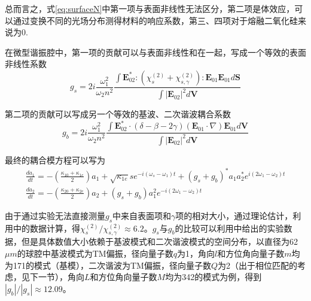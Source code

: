 \documentclass[UTF8,a4paper,cs4size,hyperref]{ctexart}
\begin{document}
总而言之，式\ref{eq:surfaceN}中第一项与表面非线性无法区分，第二项是体效应，可以通过变换不同的光场分布测得材料的响应系数，第三、四项对于熔融二氧化硅来说为0.

在微型谐振腔中，第一项的贡献可以与表面非线性和在一起，写成一个等效的表面非线性系数
\begin{equation}
g_s = 2i\frac{\omega_1^2}{\omega_2n^2}\frac{\int \mathbf{E}_{02}^*:(\chi^{(2)}_s+\chi^{(2)}_{s,\gamma}):\mathbf{E}_{01}\mathbf{E}_{01} d\mathbf{S}}{\int |\mathbf{E}_{02}|^2 d\mathbf{V}}
\label{eq:gs}
\end{equation}


第二项的贡献可以写成另一个等效的基波、二次谐波耦合系数
\begin{equation}
g_b =  2i\frac{\omega_1^2}{\omega_2n^2}\frac{\int \mathbf{E}_{02}^* \cdot (\delta-\beta-2\gamma)(\mathbf{E}_{01}\cdot\nabla)\mathbf{E}_{01} d\mathbf{V}}{\int |\mathbf{E}_{02}|^2 d\mathbf{V}}
\label{eq:gb}
\end{equation}

最终的耦合模方程可以写为
\begin{gather}
\label{eq:cpmode}
\frac{da_1}{dt} = -(\frac{\kappa_{10}+\kappa_{1e}}{2})a_1+\sqrt{\kappa_{1e}}se^{-i(\omega_s-\omega_1)t}+(g_s+g_b)^*a_1a_2^*e^{i(2\omega_1-\omega_2)t} \\
\frac{da_2}{dt} = -(\frac{\kappa_{20}+\kappa_{2e}}{2})a_2+(g_s+g_b)a_1^2e^{-i(2\omega_1-\omega_2)t}
\label{eq:cpmode2}
\end{gather}

由于通过实验无法直接测量$g_s$中来自表面项和$\gamma$项的相对大小，通过理论估计，利用\cite{terhune1987second}中的数据计算，得$\chi^{(2)}_s/\chi^{(2)}_{s,\gamma}\approx 6.2$。$g_s$与$g_b$的比较可以利用\cite{rodriguez2008calibration}中给出的实验数据，但是具体数值大小依赖于基波模式和二次谐波模式的空间分布，以直径为62$\mu m$的球腔中基波模式为TM偏振，径向量子数$q$为1，角向$l$和方位角向量子数$m$均为171的模式（基模），二次谐波为TM偏振，径向量子数$Q$为2（出于相位匹配的考虑，见下一节），角向$L$和方位角向量子数$M$均为342的模式为例，得到$|g_b|/|g_s|\approx12.09$。
\end{document}
